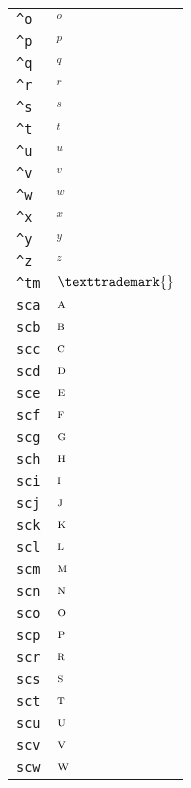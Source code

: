 \begin{longtable}{ll}
\texttt{\textasciicircum o}&${}^o{}$\\
\texttt{\textasciicircum p}&${}^p{}$\\
\texttt{\textasciicircum q}&${}^q{}$\\
\texttt{\textasciicircum r}&${}^r{}$\\
\texttt{\textasciicircum s}&${}^s{}$\\
\texttt{\textasciicircum t}&${}^t{}$\\
\texttt{\textasciicircum u}&${}^u{}$\\
\texttt{\textasciicircum v}&${}^v{}$\\
\texttt{\textasciicircum w}&${}^w{}$\\
\texttt{\textasciicircum x}&${}^x{}$\\
\texttt{\textasciicircum y}&${}^y{}$\\
\texttt{\textasciicircum z}&${}^z{}$\\
\texttt{\textasciicircum tm}&${}\texttrademark{}$\\
\texttt{sca}&${}{\textsc{a}}{}$\\
\texttt{scb}&${}{\textsc{b}}{}$\\
\texttt{scc}&${}{\textsc{c}}{}$\\
\texttt{scd}&${}{\textsc{d}}{}$\\
\texttt{sce}&${}{\textsc{e}}{}$\\
\texttt{scf}&${}{\textsc{f}}{}$\\
\texttt{scg}&${}{\textsc{g}}{}$\\
\texttt{sch}&${}{\textsc{h}}{}$\\
\texttt{sci}&${}{\textsc{i}}{}$\\
\texttt{scj}&${}{\textsc{j}}{}$\\
\texttt{sck}&${}{\textsc{k}}{}$\\
\texttt{scl}&${}{\textsc{l}}{}$\\
\texttt{scm}&${}{\textsc{m}}{}$\\
\texttt{scn}&${}{\textsc{n}}{}$\\
\texttt{sco}&${}{\textsc{o}}{}$\\
\texttt{scp}&${}{\textsc{p}}{}$\\
\texttt{scr}&${}{\textsc{r}}{}$\\
\texttt{scs}&${}{\textsc{s}}{}$\\
\texttt{sct}&${}{\textsc{t}}{}$\\
\texttt{scu}&${}{\textsc{u}}{}$\\
\texttt{scv}&${}{\textsc{v}}{}$\\
\texttt{scw}&${}{\textsc{w}}{}$\\

\end{longtable}
